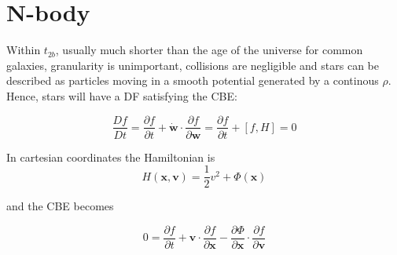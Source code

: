 \documentclass[12pt,twoside,openany]{book}
\begin{document}
\chapter{N-body}\label{chap:chapter3}

Within $t_{2b}$, usually much shorter than the age of the universe for common galaxies, 
granularity is unimportant, collisions are negligible and stars can be described as
 particles moving in a smooth potential
generated by a continous $\rho$. Hence, stars will have a DF satisfying the CBE: 

\begin{equation}\label{CBE}
    \frac{Df}{Dt}=\frac{\partial f}{\partial t}+
    \mathbf{\dot{w}}\cdot \frac{\partial f}{\partial \mathbf{w}}=
    \frac{\partial f}{\partial t}+[f,H]=0
\end{equation}



In cartesian coordinates the Hamiltonian is
\begin{equation}\label{Hamiltonian in cartesian coord.}
    H(\mathbf{x},\mathbf{v})=\frac{1}{2}v^2+\Phi(\mathbf{x})
\end{equation}

and the CBE becomes

\begin{equation}\label{CBE in cartesian coord.}
    0=\frac{\partial f}{\partial t}+\mathbf{v}\cdot 
    \frac{\partial f}{\partial \mathbf{x}}-
    \frac{\partial \Phi}{\partial \mathbf{x}}
    \cdot \frac{\partial f}{\partial \mathbf{v}}
\end{equation}
\end{document}
